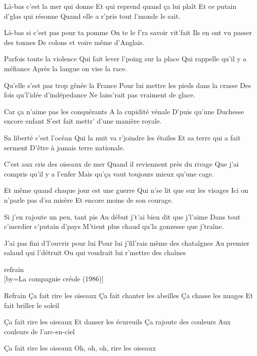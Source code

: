 \beginverse
Là-bas c'est la mer qui donne
Et qui reprend quand ça lui plaît
Et ce putain d'glas qui résonne
Quand elle a r'pris tout l'monde le sait.
\endverse

\beginverse
Là-bas si c'est pas pour ta pomme
On te le f'ra savoir vit'fait
Ils en ont vu passer des tonnes
De colons et voire même d'Anglais.
\endverse

\beginverse
Parfois toute la violence
Qui fait lever l'poing sur la place
Qui rappelle qu'il y a méfiance
Après la langue on vise la race.
\endverse

\beginverse
Qu'elle s'est pas trop gênée la France
Pour lui mettre les pieds dans la crasse
Des fois qu'l'idée d'indépedance
Ne laiss'rait pas vraiment de glace.
\endverse

\beginverse
Car ça n'aime pas les conquérants
A la cupidité vénale
D'puis qu'une Duchesse encore enfant
S'est fait mettr' d'une manière royale.
\endverse

\beginverse
Sa liberté c'est l'océan
Qui la nuit va r'joindre les étoiles
Et sa terre qui a fait serment
D'être à jamais terre nationale.
\endverse

\beginverse
C'est aux cris des oiseaux de mer
Quand il reviennent près du rivage
Que j'ai compris qu'il y a l'enfer
Mais qu'ça vaut toujours mieux qu'une cage.
\endverse

\beginverse
Et même quand chaque jour est une guerre
Qui n'se lit que sur les visages
Ici on n'parle pas d'sa misère
Et encore moins de son courage.
\endverse

\beginverse
Si j'en rajoute un peu, tant pis
Au début j't'ai bien dit que j'l'aime
Dans tout c'merdier c'putain d'pays
M'tient plus chaud qu'la gonzesse que j'traîne.
\endverse

\beginverse
J'ai pas fini d'l'ouvrir pour lui
Pour lui j'fil'rais même des chataîgnes
Au premier salaud qui l'détruit
Ou qui voudrait lui r'mettre des chaînes
\endverse

	refrain \\[bis]

[by={La compagnie créole (1986)}]

	Refrain
Ça fait rire les oiseaux
Ça fait chanter les abeilles
Ça chasse les nuages
Et fait briller le soleil

\beginverse
Ça fait rire les oiseaux
Et danser les écureuils
Ça rajoute des couleurs
Aux couleurs de l'arc-en-ciel
\endverse

\beginverse
Ça fait rire les oiseaux
Oh, oh, oh, rire les oiseaux
\\[bis]
\endverse

